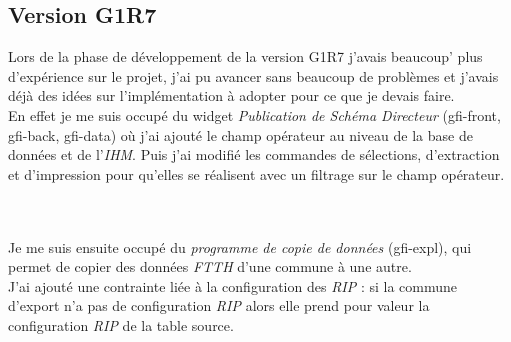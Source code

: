 \subsection{Version G1R7}
Lors de la phase de développement de la version G1R7 j'avais beaucoup' plus d'expérience sur le projet, j'ai pu avancer sans beaucoup de problèmes et j'avais déjà des idées sur l'implémentation à adopter pour ce que je devais faire.
\\En effet je me suis occupé du widget \textit{Publication de Schéma Directeur} (gfi-front, gfi-back, gfi-data) où j'ai ajouté le champ opérateur au niveau de la base de données et de l'\textit{IHM}. Puis j'ai modifié les commandes de sélections, d'extraction et d'impression pour qu'elles se réalisent avec un filtrage sur le champ opérateur.
\\\\
\noindent%
\begin{minipage}{\linewidth}%
\label{visina8}%
\end{minipage}\\

Je me suis ensuite occupé du \textit{programme de copie de données} (gfi-expl), qui permet de copier des données \textit{FTTH} d'une commune à une autre.
\\J'ai ajouté une contrainte liée à la configuration des \textit{RIP} : si la commune d'export n'a pas de configuration \textit{RIP} alors elle prend pour valeur la configuration \textit{RIP} de la table source.

